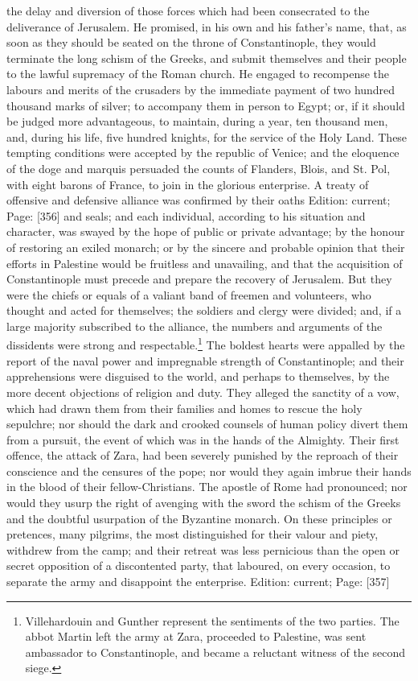 the delay and diversion of those forces which had been consecrated to the deliverance of Jerusalem. He promised, in his own and his father\texthebrew{}’s name, that, as soon as they should be seated on the throne of Constantinople, they would terminate the long schism of the Greeks, and submit themselves and their people to the lawful supremacy of the Roman church. He engaged to recompense the labours and merits of the crusaders by the immediate payment of two hundred thousand marks of silver; to accompany them in person to Egypt; or, if it should be judged more advantageous, to maintain, during a year, ten thousand men, and, during his life, five hundred knights, for the service of the Holy Land. These tempting conditions were accepted by the republic of Venice; and the eloquence of the doge and marquis persuaded the counts of Flanders, Blois, and St. Pol, with eight barons of France, to join in the glorious enterprise. A treaty of offensive and defensive alliance was confirmed by their oaths Edition: current; Page: [356] and seals; and each individual, according to his situation and character, was swayed by the hope of public or private advantage; by the honour of restoring an exiled monarch; or by the sincere and probable opinion that their efforts in Palestine would be fruitless and unavailing, and that the acquisition of Constantinople must precede and prepare the recovery of Jerusalem. But they were the chiefs or equals of a valiant band of freemen and volunteers, who thought and acted for themselves; the soldiers and clergy were divided; and, if a large majority subscribed to the alliance, the numbers and arguments of the dissidents were strong and respectable.\footnote{Villehardouin and Gunther represent the sentiments of the two parties. The abbot Martin left the army at Zara, proceeded to Palestine, was sent ambassador to Constantinople, and became a reluctant witness of the second siege.} The boldest hearts were appalled by the report of the naval power and impregnable strength of Constantinople; and their apprehensions were disguised to the world, and perhaps to themselves, by the more decent objections of religion and duty. They alleged the sanctity of a vow, which had drawn them from their families and homes to rescue the holy sepulchre; nor should the dark and crooked counsels of human policy divert them from a pursuit, the event of which was in the hands of the Almighty. Their first offence, the attack of Zara, had been severely punished by the reproach of their conscience and the censures of the pope; nor would they again imbrue their hands in the blood of their fellow-Christians. The apostle of Rome had pronounced; nor would they usurp the right of avenging with the sword the schism of the Greeks and the doubtful usurpation of the Byzantine monarch. On these principles or pretences, many pilgrims, the most distinguished for their valour and piety, withdrew from the camp; and their retreat was less pernicious than the open or secret opposition of a discontented party, that laboured, on every occasion, to separate the army and disappoint the enterprise.
Edition: current; Page: [357]

